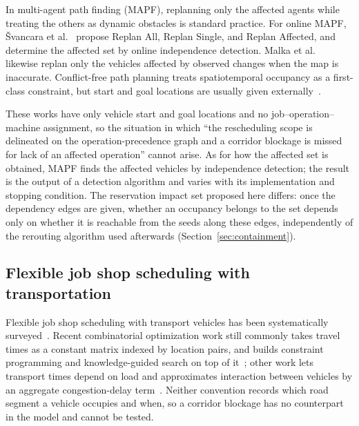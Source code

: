 \documentclass[manuscript,screen,review]{acmart}
\begin{document}
In multi-agent path finding (MAPF), replanning only the affected agents while treating the others as dynamic obstacles is standard practice.
For online MAPF, \v{S}vancara et al.~\cite{svancara2019online} propose
Replan All, Replan Single, and Replan Affected, and determine the affected set by online independence detection.
Malka et al.~\cite{malka2024online} likewise replan only the vehicles affected by observed changes when the map is inaccurate.
Conflict-free path planning treats spatiotemporal occupancy as a first-class constraint, but start and goal locations are usually given externally~\cite{zhang2024guidance}.

These works have only vehicle start and goal locations and no job--operation--machine assignment,
so the situation in which ``the rescheduling scope is delineated on the operation-precedence graph and a corridor blockage is missed for lack of an affected operation'' cannot arise.
As for how the affected set is obtained, MAPF finds the affected vehicles by independence detection; the result is the output of a detection algorithm and varies with its implementation and stopping condition.
The reservation impact set proposed here differs: once the dependency edges are given, whether an occupancy belongs to the set
depends only on whether it is reachable from the seeds along these edges, independently of the rerouting algorithm used afterwards
(Section~\ref{sec:containment}).

\subsection{Flexible job shop scheduling with transportation}
\label{sec:rw_position}

Flexible job shop scheduling with transport vehicles has been systematically surveyed~\cite{xin2025review}.
Recent combinatorial optimization work still commonly takes travel times as a constant matrix indexed by location pairs,
and builds constraint programming and knowledge-guided search on top of it~\cite{meng2025cp,qin2026knowledge};
other work lets transport times depend on load and approximates interaction between vehicles by an aggregate congestion-delay term~\cite{jafarian2026integrated}.
Neither convention records which road segment a vehicle occupies and when, so a corridor blockage has no counterpart in the model and cannot be tested.
\end{document}
